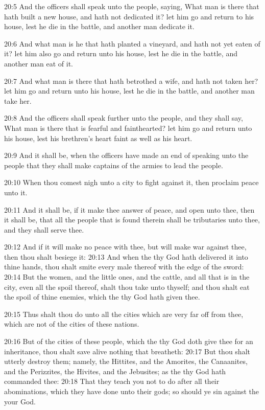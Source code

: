 20:5 And the officers shall speak unto the people, saying, What man is
there that hath built a new house, and hath not dedicated it? let him
go and return to his house, lest he die in the battle, and another man
dedicate it.

20:6 And what man is he that hath planted a vineyard, and hath not yet
eaten of it? let him also go and return unto his house, lest he die in
the battle, and another man eat of it.

20:7 And what man is there that hath betrothed a wife, and hath not
taken her? let him go and return unto his house, lest he die in the
battle, and another man take her.

20:8 And the officers shall speak further unto the people, and they
shall say, What man is there that is fearful and fainthearted? let him
go and return unto his house, lest his brethren's heart faint as well
as his heart.

20:9 And it shall be, when the officers have made an end of speaking
unto the people that they shall make captains of the armies to lead
the people.

20:10 When thou comest nigh unto a city to fight against it, then
proclaim peace unto it.

20:11 And it shall be, if it make thee answer of peace, and open unto
thee, then it shall be, that all the people that is found therein
shall be tributaries unto thee, and they shall serve thee.

20:12 And if it will make no peace with thee, but will make war
against thee, then thou shalt besiege it: 20:13 And when the \LORD thy
God hath delivered it into thine hands, thou shalt smite every male
thereof with the edge of the sword: 20:14 But the women, and the
little ones, and the cattle, and all that is in the city, even all the
spoil thereof, shalt thou take unto thyself; and thou shalt eat the
spoil of thine enemies, which the \LORD thy God hath given thee.

20:15 Thus shalt thou do unto all the cities which are very far off
from thee, which are not of the cities of these nations.

20:16 But of the cities of these people, which the \LORD thy God doth
give thee for an inheritance, thou shalt save alive nothing that
breatheth: 20:17 But thou shalt utterly destroy them; namely, the
Hittites, and the Amorites, the Canaanites, and the Perizzites, the
Hivites, and the Jebusites; as the \LORD thy God hath commanded thee:
20:18 That they teach you not to do after all their abominations,
which they have done unto their gods; so should ye sin against the
\LORD your God.

